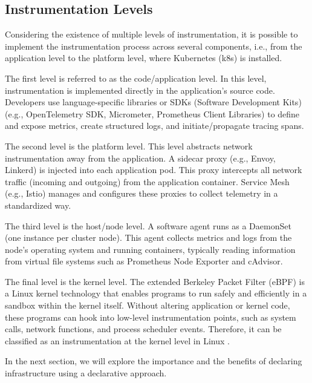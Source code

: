 \subsection{Instrumentation Levels}
\label{subsec:instrumentation-levels}

Considering the existence of multiple levels of instrumentation, it is possible to implement the instrumentation process across several components, i.e., from the application level to the platform level, where Kubernetes (k8s) is installed.

The first level is referred to as the code/application level. In this level, instrumentation is implemented directly in the application's source code. Developers use language-specific libraries or SDKs (Software Development Kits) (e.g., OpenTelemetry SDK, Micrometer, Prometheus Client Libraries) to define and expose metrics, create structured logs, and initiate/propagate tracing spans.

The second level is the platform level. This level abstracts network instrumentation away from the application. A sidecar proxy (e.g., Envoy, Linkerd) is injected into each application pod. This proxy intercepts all network traffic (incoming and outgoing) from the application container. Service Mesh (e.g., Istio) manages and configures these proxies to collect telemetry in a standardized way.

The third level is the host/node level. A software agent runs as a DaemonSet (one instance per cluster node). This agent collects metrics and logs from the node's operating system and running containers, typically reading information from virtual file systems such as Prometheus Node Exporter and cAdvisor.

The final level is the kernel level. The extended Berkeley Packet Filter (eBPF) is a Linux kernel technology that enables programs to run safely and efficiently in a sandbox within the kernel itself. Without altering application or kernel code, these programs can hook into low-level instrumentation points, such as system calls, network functions, and process scheduler events. Therefore, it can be classified as an instrumentation at the kernel level in Linux \cite{rice_2023}.

In the next section, we will explore the importance and the benefits of declaring infrastructure using a declarative approach.